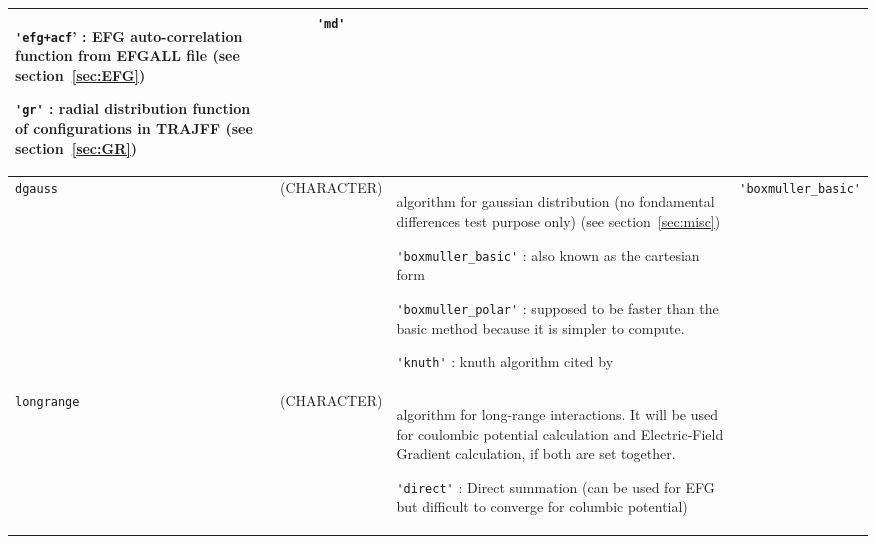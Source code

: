 \documentclass[a4paper]{article}
\begin{document}
\begin{longtable}{l|c|m{8cm}|m{2cm}}
					\verb?'efg+acf?' : EFG auto-correlation function from EFGALL file 
					(see section~\ref{sec:EFG})\newline

					\verb?'gr'? : radial distribution function of configurations in TRAJFF
					(see section~\ref{sec:GR}) \newline                                                 & \verb?'md'?   \tabularnewline
\hline
\rule[-0.75cm]{0cm}{1.5cm}
\verb?dgauss?    & (CHARACTER)        & \newline algorithm for gaussian distribution (no fondamental differences test purpose only) 
                                        (see section~\ref{sec:misc}) \newline  

                                        \verb?'boxmuller_basic'? : also known as the cartesian form  \newline

					\verb?'boxmuller_polar'? : supposed to be faster than the basic method because it is 
					simpler to compute.     \newline

					\verb?'knuth'? : knuth algorithm cited by~\cite{B-ALLEN_TILDESLEY} \newline         & \verb?'boxmuller_basic'? \tabularnewline
\hline
\rule[-0.75cm]{0cm}{1.5cm}
\verb?longrange? & (CHARACTER)        & \newline algorithm for long-range interactions. It will be used for coulombic potential 
                                        calculation and Electric-Field Gradient calculation, if both are set together. \newline

					\verb?'direct'? : Direct summation (can be used for EFG but difficult to converge for columbic potential) \newline


\end{longtable}
\end{document}

